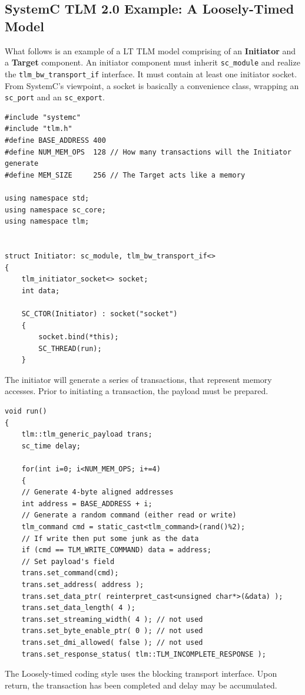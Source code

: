 \documentclass[11pt]{article}
\begin{document}
\subsection{SystemC TLM 2.0 Example: A Loosely-Timed Model}
\label{AppendixE}
What follows is an example of a LT TLM model comprising of an \textbf{Initiator} and a \textbf{Target} component.
An initiator component must inherit \texttt{sc\_module} and realize the \texttt{tlm\_bw\_transport\_if} interface.
It must contain at least one initiator socket.
From SystemC's viewpoint, a socket is basically a convenience class, wrapping an \texttt{ sc\_port} and an \texttt{sc\_export}.
\begin{verbatim}
#include "systemc"
#include "tlm.h"
#define BASE_ADDRESS 400
#define NUM_MEM_OPS  128 // How many transactions will the Initiator generate
#define MEM_SIZE     256 // The Target acts like a memory

using namespace std;
using namespace sc_core;
using namespace tlm;


struct Initiator: sc_module, tlm_bw_transport_if<>
{
    tlm_initiator_socket<> socket; 
    int data;

    SC_CTOR(Initiator) : socket("socket")
	{
	    socket.bind(*this);
	    SC_THREAD(run);
	}
\end{verbatim}
The initiator will generate a series of transactions, that represent memory accesses.
Prior to initiating a transaction, the payload must be prepared.
\begin{verbatim}
void run()
{
    tlm::tlm_generic_payload trans;
    sc_time delay;

    for(int i=0; i<NUM_MEM_OPS; i+=4)
    {
	// Generate 4-byte aligned addresses
	int address = BASE_ADDRESS + i;
	// Generate a random command (either read or write)
	tlm_command cmd = static_cast<tlm_command>(rand()%2);
	// If write then put some junk as the data
	if (cmd == TLM_WRITE_COMMAND) data = address;
	// Set payload's field
	trans.set_command(cmd);
	trans.set_address( address );
	trans.set_data_ptr( reinterpret_cast<unsigned char*>(&data) );
	trans.set_data_length( 4 );
	trans.set_streaming_width( 4 ); // not used
	trans.set_byte_enable_ptr( 0 ); // not used
	trans.set_dmi_allowed( false ); // not used
	trans.set_response_status( tlm::TLM_INCOMPLETE_RESPONSE );
\end{verbatim}
The Loosely-timed coding style uses the blocking transport interface.
Upon return, the transaction has been completed and delay may be accumulated.
\end{document}
